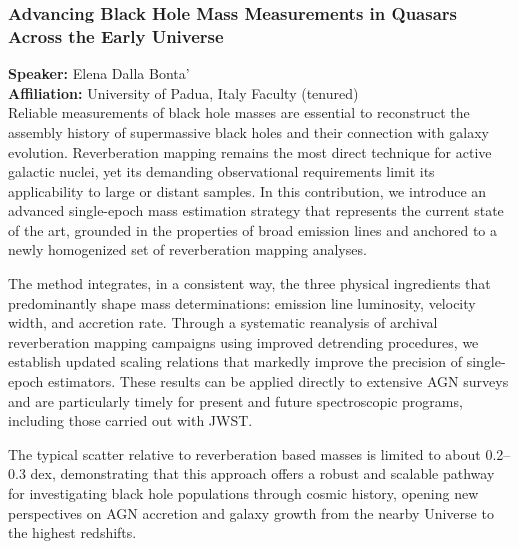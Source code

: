\subsubsection*{Advancing Black Hole Mass Measurements in Quasars Across the Early Universe}
\textbf{Speaker:} Elena Dalla Bonta' \\
\textbf{Affiliation:} University of Padua, Italy \textperiodcentered{} Faculty (tenured)\\
Reliable measurements of black hole masses are essential to reconstruct the assembly history of supermassive black holes and their connection with galaxy evolution. Reverberation mapping remains the most direct technique for active galactic nuclei, yet its demanding observational requirements limit its applicability to large or distant samples. In this contribution, we introduce an advanced single-epoch mass estimation strategy that represents the current state of the art, grounded in the properties of broad emission lines and anchored to a newly homogenized set of reverberation mapping analyses.

The method integrates, in a consistent way, the three physical ingredients that predominantly shape mass determinations: emission line luminosity, velocity width, and accretion rate. Through a systematic reanalysis of archival reverberation mapping campaigns using improved detrending procedures, we establish updated scaling relations that markedly improve the precision of single-epoch estimators. These results can be applied directly to extensive AGN surveys and are particularly timely for present and future spectroscopic programs, including those carried out with JWST.

The typical scatter relative to reverberation based masses is limited to about 0.2–0.3 dex, demonstrating that this approach offers a robust and scalable pathway for investigating black hole populations through cosmic history, opening new perspectives on AGN accretion and galaxy growth from the nearby Universe to the highest redshifts.

\hypertarget{abs-18}{}

